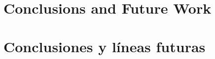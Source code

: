 %

{
  \chapter{Conclusions and Future Work}
}
{
  \chapter{Conclusiones y líneas futuras}
}
\label{cha:compendium-conclusions}









